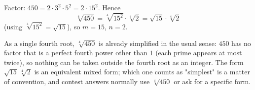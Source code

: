 Factor: $450=2\cdot3^2\cdot5^2=2\cdot15^2$. Hence
\[
\sqrt[4]{450}=\sqrt[4]{15^2}\cdot\sqrt[4]{2}=\boxed{\sqrt{15}\cdot\sqrt[4]{2}}
\]
(using $\sqrt[4]{15^2}=\sqrt{15}$), so $m=15$, $n=2$.

As a single fourth root, $\sqrt[4]{450}$ is already simplified in the usual sense: $450$ has no factor that is a perfect fourth power other than $1$ (each prime appears at most twice), so nothing can be taken outside the fourth root as an integer. The form $\sqrt{15}\,\sqrt[4]2$ is an equivalent mixed form; which one counts as "simplest" is a matter of convention, and contest answers normally use $\sqrt[4]{450}$ or ask for a specific form.
